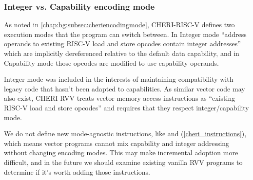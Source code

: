 \subsubsection{Integer vs. Capability encoding mode\label{chap:emu:rvv_int_mode}}
As noted in \cref{chap:bg:subsec:cheriencodingmode}, CHERI-RISC-V defines two execution modes that the program can switch between.
In Integer mode \enquote{address operands to existing RISC-V load and store opcodes contain integer addresses} which are implicitly dereferenced relative to the default data capability, and in Capability mode those opcodes are modified to use capability operands.

Integer mode was included in the interests of maintaining compatibility with legacy code that hasn't been adapted to capabilities.
As similar vector code may also exist, CHERI-RVV treats vector memory access instructions as \enquote{existing RISC-V load and store opcodes} and requires that they respect integer/capability mode.

We do not define new mode-agnostic instructions, like  and  (\cref{cheri_instructions}), which means vector programs cannot mix capability and integer addressing without changing encoding modes.
This may make incremental adoption more difficult, and in the future we should examine existing vanilla RVV programs to determine if it's worth adding those instructions.
